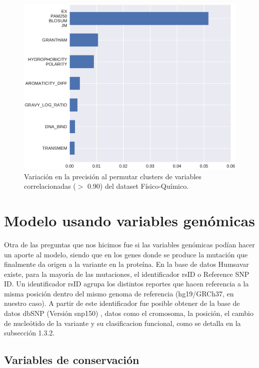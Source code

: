 \newpage

\begin{figure}[H]
    \centering
    \includegraphics[scale=0.6]{documents/latex/figures/3/structural/structural_importance_cluster.pdf}
    \caption{Variación en la precisión al permutar clusters de variables correlacionadas ($>$ 0.90) del dataset Físico-Químico.}
    \label{fig:importances_structural_cluster}
\end{figure}


\section{Modelo usando variables genómicas}

Otra de las preguntas que nos hicimos fue si las variables genómicas podían hacer un aporte al modelo, siendo que en los genes donde se produce la mutación que finalmente da origen a la variante en la proteína. En la base de datos Humsavar existe, para la mayoría de las mutaciones, el identificador rsID o Reference SNP ID. Un identificador rsID agrupa los distintos reportes que hacen referencia a la misma posición dentro del mismo genoma de referencia (hg19/GRCh37, en nuestro caso). A partir de este identificador fue posible obtener de la base de datos dbSNP (Versión snp150) \cite{dbSNP}, datos como el cromosoma, la posición, el cambio de nucleótido de la variante y su clasificacion funcional, como se detalla en la subsección 1.3.2. 

\subsection{Variables de conservación}

